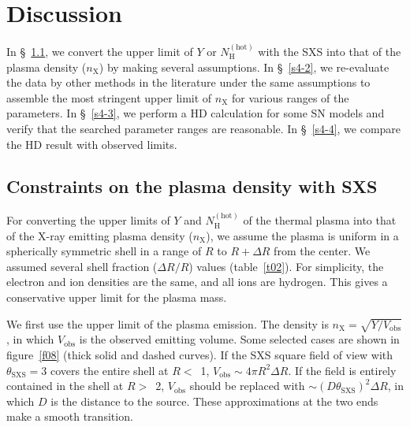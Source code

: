 \documentclass[]{pasj01}
\begin{document}
\section{Discussion}\label{s4}
In \S~\ref{s4-1}, we convert the upper limit of $Y$ or $N_{\mathrm{H}}^{\mathrm{(hot)}}$
with the SXS into that of the plasma density ($n_{\mathrm{X}}$) by making several
assumptions. In \S~\ref{s4-2}, we re-evaluate the data by other methods in the literature
under the same assumptions to assemble the most stringent upper limit of
$n_{\mathrm{X}}$ for various ranges of the parameters. In \S~\ref{s4-3}, we perform a HD
calculation for some SN models and verify that the searched parameter ranges are
reasonable. In \S~\ref{s4-4}, we compare the HD result with observed limits.



\subsection{Constraints on the plasma density with SXS}\label{s4-1}
For converting the upper limits of $Y$ and $N_{\mathrm{H}}^{\mathrm{(hot)}}$ of the
thermal plasma into that of the X-ray emitting plasma density ($n_{\mathrm{X}}$), we
assume the plasma is uniform in a spherically symmetric shell in a range of $R$ to
$R+\Delta R$ from the center. We assumed several shell fraction ($\Delta R/R$) values
(table~\ref{t02}). For simplicity, the electron and ion densities are the same, and all
ions are hydrogen. This gives a conservative upper limit for the plasma mass.

We first use the upper limit of the plasma emission. The density is $n_{\mathrm{X}} =
\sqrt{Y/V_{\mathrm{obs}}}$, in which $V_{\mathrm{obs}}$ is the observed emitting
volume. Some selected cases are shown in figure~\ref{f08} (thick solid and dashed
curves). If the SXS square field of view with $\theta_{\mathrm{SXS}}=$3 covers
the entire shell at $R<$~1, $V_{\mathrm{obs}} \sim 4 \pi R^{2} \Delta R$. If the
field is entirely contained in the shell at $R>$~2, $V_{\mathrm{obs}}$ should be
replaced with $\sim (D\theta_{\mathrm{SXS}})^{2}\Delta R$, in which $D$ is the distance
to the source. These approximations at the two ends make a smooth transition.
\end{document}
